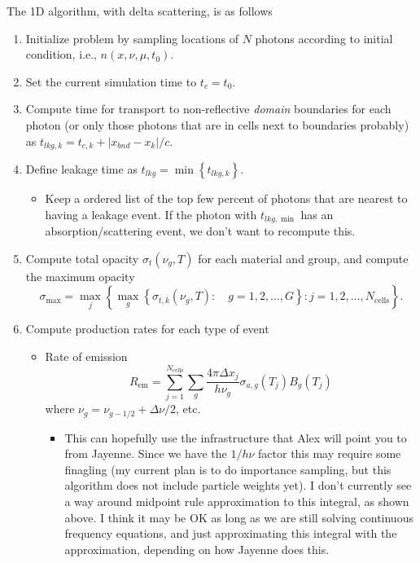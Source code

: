\documentclass{article}
\newcommand{\ncl}{\ensuremath{N_{\text{cells}}}}
\newcommand{\Rem}{\ensuremath{R_{\text{em}}}}
\begin{document}
The 1D algorithm, with delta scattering, is as follows
\begin{enumerate}
\item Initialize problem by sampling locations of $N$ photons according to
initial condition, i.e., $n(x,\nu,\mu,t_0)$.  
\item Set the current simulation time to $t_{c}=t_0$.
\item Compute time for transport to non-reflective \emph{domain} boundaries 
for each photon (or only those photons that are in cells next to boundaries
probably) as $t_{lkg,k} = t_{c,k} + |x_{bnd} - x_k|/c$.  
\item Define leakage time as $t_{lkg} = \min\left\{t_{lkg,k}\right\}$.
\begin{itemize}
\item Keep a ordered list of the top few percent of photons that are nearest to having a
leakage event.  If the photon with $t_{lkg,\min}$ has an absorption/scattering event, we don't
want to recompute this.  
\end{itemize}
\item Compute total opacity $\sigma_t(\nu_g,T)$ for each material and group, and compute the
maximum opacity
\begin{equation}
   \sigma_{\max} = \max_j\left\{\max_g\left\{\sigma_{t,k}(\nu_g,T): \quad
g=1,2,\ldots,G\right\}: j=1,2,\ldots,\ncl \right\}.
\end{equation}
\item Compute production rates for each type of event
\begin{itemize}
  \item Rate of emission
\begin{equation}
  \Rem = \sum_{j=1}^{\ncl} \sum_{g} \frac{4\pi\Delta x_j}{h \nu_g} \sigma_{a,g}(T_j)B_g(T_j)
\end{equation}
where $\nu_g = \nu_{g-1/2} + \Delta \nu/2$, etc.
\begin{itemize}
 \item This can hopefully use the infrastructure that Alex will point you to from
Jayenne.  Since we have the $1/h\nu$ factor this may require some finagling (my
current plan is to do importance sampling, but this algorithm does not include
particle weights yet). I don't
currently see a way around midpoint rule approximation to this integral, as shown
above.  I think it may be OK as long as we are still solving continuous frequency
equations, and just approximating this integral with the approximation, depending on
how Jayenne does this.
\end{itemize}

\end{itemize}
\end{enumerate}
\end{document}
